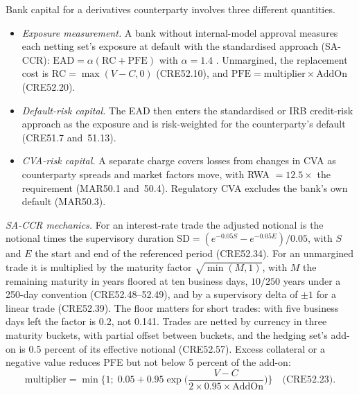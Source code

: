 \begin{qfrule}\label{rule:counterparty-credit-cva-capital}
 Bank capital for a derivatives counterparty involves three different quantities.
\begin{itemize}
\item \emph{Exposure measurement.} A bank without internal-model approval measures each netting set's exposure at default with the standardised approach (SA-CCR): $\mathrm{EAD}=\alpha(\mathrm{RC}+\mathrm{PFE})$ with $\alpha=1.4$ \citep[CRE52.1]{basel-framework-ccr-mar-2026}. Unmargined, the replacement cost is $\mathrm{RC}=\max(V-C,0)$ (CRE52.10), and $\mathrm{PFE}=\text{multiplier}\times\mathrm{AddOn}$ (CRE52.20).
\item \emph{Default-risk capital.} The EAD then enters the standardised or IRB credit-risk approach as the exposure and is risk-weighted for the counterparty's default (CRE51.7 and~51.13).
\item \emph{CVA-risk capital.} A separate charge covers losses from changes in CVA as counterparty spreads and market factors move, with RWA $=12.5\times$ the requirement (MAR50.1 and~50.4). Regulatory CVA excludes the bank's own default (MAR50.3).
\end{itemize}

\emph{SA-CCR mechanics.} For an interest-rate trade the adjusted notional is the notional times the supervisory duration $\mathrm{SD}=(e^{-0.05S}-e^{-0.05E})/0.05$, with $S$ and $E$ the start and end of the referenced period (CRE52.34). For an unmargined trade it is multiplied by the maturity factor $\sqrt{\min(M,1)}$, with $M$ the remaining maturity in years floored at ten business days, $10/250$ years under a 250-day convention (CRE52.48--52.49), and by a supervisory delta of $\pm1$ for a linear trade (CRE52.39). The floor matters for short trades: with five business days left the factor is 0.2, not 0.141. Trades are netted by currency in three maturity buckets, with partial offset between buckets, and the hedging set's add-on is 0.5 percent of its effective notional (CRE52.57). Excess collateral or a negative value reduces PFE but not below 5 percent of the add-on:
\[ \text{multiplier}=\min\Big\{1;\;0.05+0.95\exp\Big(\frac{V-C}{2\times0.95\times\mathrm{AddOn}}\Big)\Big\}\quad\text{(CRE52.23).} \]


\end{qfrule}
